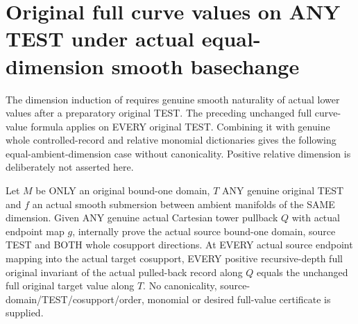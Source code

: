 \section{Original full curve values on ANY TEST under actual equal-dimension smooth basechange}

The dimension induction of \cite[Section~5]{bierstone-milman08-functoriality}
requires genuine smooth naturality of actual lower values after a
preparatory original TEST. The preceding unchanged full curve-value
formula applies on EVERY original TEST. Combining it with genuine whole
controlled-record and relative monomial dictionaries gives the following
equal-ambient-dimension case without canonicality. Positive relative
dimension is deliberately not asserted here.

\begin{theorem}
\label{hir:original-any-test-curve-etale-full-values}
\leanok
Let $M$ be ONLY an original bound-one domain, $T$ ANY genuine original
TEST and $f$ an actual smooth submersion between ambient manifolds of the
SAME dimension. Given ANY genuine actual Cartesian tower pullback $Q$
with actual endpoint map $g$, internally prove the actual source bound-one
domain, source TEST and BOTH whole cosupport directions. At EVERY actual
source endpoint mapping into the actual target cosupport, EVERY
positive recursive-depth full original invariant of the actual pulled-back
record along $Q$ equals the unchanged full original target value along
$T$. No canonicality, source-domain/TEST/cosupport/order, monomial or
desired full-value certificate is supplied.
\end{theorem}
